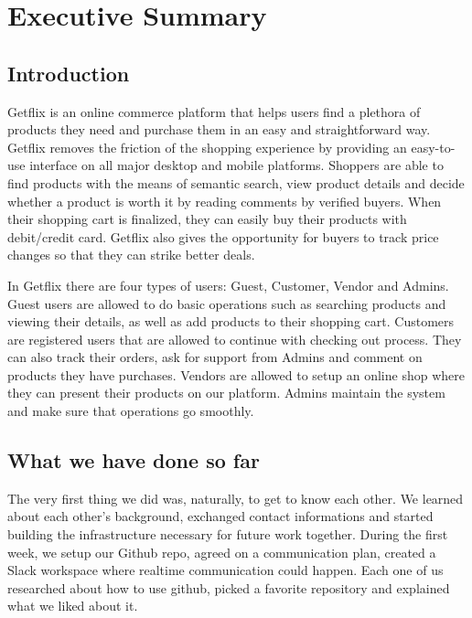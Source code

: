 \documentclass[]{article}
\begin{document}
\hypertarget{executive-summary}{%
    \section{Executive Summary}\label{executive-summary}}

\hypertarget{introduction}{%
    \subsection{Introduction}\label{introduction}}

Getflix is an online commerce platform that helps users find a plethora
of products they need and purchase them in an easy and straightforward
way. Getflix removes the friction of the shopping experience by
providing an easy-to-use interface on all major desktop and mobile
platforms. Shoppers are able to find products with the means of semantic
search, view product details and decide whether a product is worth it by
reading comments by verified buyers. When their shopping cart is
finalized, they can easily buy their products with debit/credit card.
Getflix also gives the opportunity for buyers to track price changes so
that they can strike better deals.

In Getflix there are four types of users: Guest, Customer, Vendor and
Admins. Guest users are allowed to do basic operations such as searching
products and viewing their details, as well as add products to their
shopping cart. Customers are registered users that are allowed to
continue with checking out process. They can also track their orders,
ask for support from Admins and comment on products they have purchases.
Vendors are allowed to setup an online shop where they can present their
products on our platform. Admins maintain the system and make sure that
operations go smoothly.

\hypertarget{what-we-have-done-so-far}{%
    \subsection{What we have done so far}\label{what-we-have-done-so-far}}

The very first thing we did was, naturally, to get to know each other.
We learned about each other's background, exchanged contact informations
and started building the infrastructure necessary for future work
together. During the first week, we setup our Github repo, agreed on a
communication plan, created a Slack workspace where realtime
communication could happen. Each one of us researched about how to use
github, picked a favorite repository and explained what we liked about
it.
\end{document}
